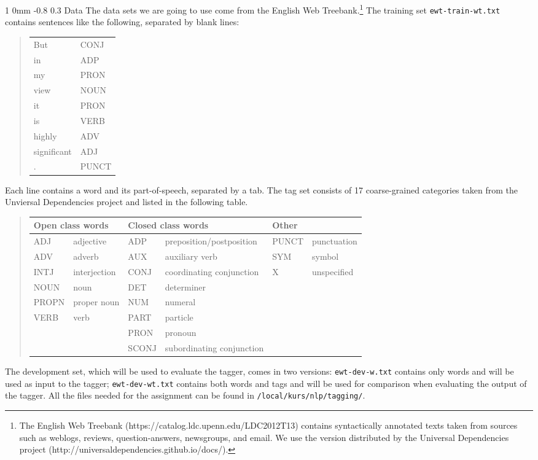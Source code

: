 \documentclass[11pt]{article}
\makeatletter
\newcommand{\newsec}[2]{\section{#1}\label{sec:#2}\noindent}
\renewcommand{\section}{\@startsection
{section}%
{1}%
{0mm}%
{-0.8\baselineskip}%
{0.3\baselineskip}%
{\bfseries\large}}%
\makeatother
\begin{document}
\newsec{Data}{data}%
The data sets we are going to use come from the English Web Treebank.\footnote{The English Web Treebank (https://catalog.ldc.upenn.edu/LDC2012T13)
contains syntactically annotated texts taken from sources such as weblogs, reviews, question-answers, newsgroups, and email. 
We use the version distributed by the Universal Dependencies project (http://universaldependencies.github.io/docs/).} The training set {\tt ewt-train-wt.txt} contains sentences like the following, separated by blank lines:
\begin{quote}
\begin{tt}
\begin{tabular}{ll}
But          &CONJ\\
in            &ADP\\
my            &PRON\\
view          &NOUN\\
it            &PRON\\
is            &VERB\\
highly        &ADV\\
significant   &ADJ\\
.             &PUNCT\\
\end{tabular}
\end{tt}
\end{quote}
Each line contains a word and its part-of-speech, separated by a tab. The tag set consists of 17 coarse-grained categories taken from the Unviersal Dependencies project and listed in the following table.
	\begin{quote}
	\renewcommand{\tabcolsep}{4pt}
	\begin{tabular}{|ll|ll|ll|}
	\hline
	\multicolumn{2}{|l|}{{\bf Open class words}} & \multicolumn{2}{l|}{{\bf Closed class words}} & \multicolumn{2}{l|}{{\bf Other}} \\
	\hline
	ADJ & adjective & ADP & preposition/postposition & PUNCT & punctuation\\
	ADV & adverb & AUX & auxiliary verb & SYM & symbol \\
	INTJ & interjection & CONJ & coordinating conjunction & X & unspecified \\
	NOUN & noun & DET & determiner & & \\
	PROPN & proper noun & NUM & numeral & & \\
	VERB & verb & PART & particle  & & \\
	 & & PRON & pronoun & & \\
	 & & SCONJ & subordinating conjunction & & \\
	\hline
	\end{tabular}
	\end{quote}
The development set, which will be used to evaluate the tagger, comes in two versions: {\tt ewt-dev-w.txt} contains only words and will be used as input to the tagger;
{\tt ewt-dev-wt.txt} contains both words and tags and will be used for comparison when evaluating the output of the tagger.
All the files needed for the assignment can be found in {\tt /local/kurs/nlp/tagging/}.
\end{document}
